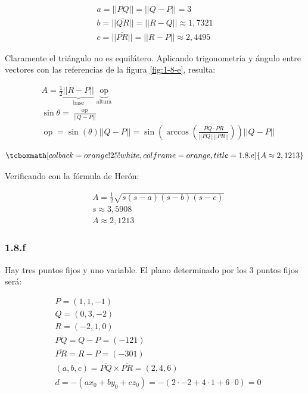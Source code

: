 \documentclass{article}
\begin{document}
\begin{subequations}
\begin{align}
a = ||\overline{PQ}|| = ||Q-P|| = 3 \\
b = ||\overline{QR}|| = ||R-Q|| \approx 1,7321 \\
c = ||\overline{PR}|| = ||R-P|| \approx 2,4495
\end{align}
\end{subequations}

Claramente el triángulo no es equilátero. Aplicando trigonometría y ángulo entre vectores con las referencias de la figura \ref{fig:1-8-e}, resulta:

\begin{subequations}
\begin{align}
& A = \frac{1}{2} \underbrace{||R-P||}_{\text{base}} \underbrace{ \mathop{op} }_{\text{altura}} \\
& \sin \theta = \frac{\mathop{op}}{||Q-P||} \\
& \mathop{op} = \sin (\theta) ||Q-P|| = \sin( \arccos \left( \frac{\overline{PQ} \cdot \overline{PR} }{||\overline{PQ}|| ||\overline{PR}||} \right) ) ||Q-P||
\end{align}
\end{subequations}

\begin{equation}
\tcboxmath[colback=orange!25!white,colframe=orange,title=1.8.e]
{ A \approx 2,1213 }
\end{equation}

Verificando con la fórmula de Herón:

\begin{subequations}
\begin{align}
& A = \frac{1}{2} \sqrt{s (s-a) (s-b) (s-c)} \\
& s \approx 3,5908 \\
& A \approx 2,1213
\end{align}
\end{subequations}

\subsubsection*{1.8.f}
\label{subsubsec:1.8.f}

Hay tres puntos fijos y uno variable. El plano determinado por los 3 puntos fijos será:

\begin{subequations}
\begin{align}
& P = (1, 1, -1) \\
& Q = (0, 3, -2) \\
& R = (-2, 1, 0) \\
& \overline{PQ} = Q-P = (-1 2 1) \\
& \overline{PR} = R-P = (-3 0 1) \\
& (a,b,c) = \overline{PQ} \times \overline{PR} = (2, 4, 6) \\
& d = -(a x_0 + b y_0 + c z_0) = -(2 \cdot -2 + 4 \cdot 1 + 6 \cdot 0) = 0
\end{align}
\end{subequations}
\end{document}
